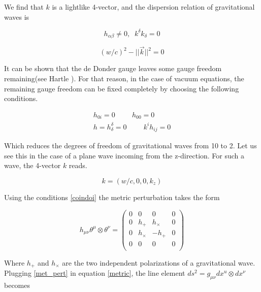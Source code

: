 We find that $k$ is a lightlike 4-vector, and the dispersion relation of gravitational waves is 

\begin{equation}
h_{\alpha \beta} \neq 0, \;\; k^\delta k_\delta = 0
\end{equation}

\begin{equation}
(w/c)^2 - || \vec{k} ||^2 = 0
\end{equation}

It can be shown that the de Donder gauge leaves some gauge freedom remaining(see Hartle \cite[chapter X]{Hartle:2021pel}). For that reason, in the case of vacuum equations, the remaining gauge freedom can be fixed completely by choosing the following conditions.

\begin{equation}\label{coindoi}
\begin{gathered}
h_{0i} = 0  \hspace{1cm} h_{00} = 0 \\
h = h^{\delta}_{\delta} = 0  \hspace{1cm} k^{i}h_{ij} = 0
\end{gathered}
\end{equation}

Which reduces the degrees of freedom of gravitational waves from 10 to 2. Let us see this in the case of a plane wave incoming from the z-direction. For such a wave, the 4-vector $k$ reads.

\begin{equation}
k = (w/c, 0,0,k_z)
\end{equation}

Using the conditions \ref{coindoi} the metric perturbation takes the form 

\begin{equation}\label{met_pert}
h_{\mu \nu} \theta^\mu \otimes \theta^\nu = 
\begin{pmatrix}
0&0&0&0 \\
0&h_+ &h_\times &0 \\
0&h_\times &-h_+ &0 \\
0&0&0&0 \\
\end{pmatrix} 
\end{equation}

Where $h_+$ and $h_\times$ are the two independent polarizations of a gravitational wave. Plugging \ref{met_pert} in equation \ref{metric}, the line element $ds^2 = g_{\mu \nu} dx^u \otimes dx^\nu$ becomes 


